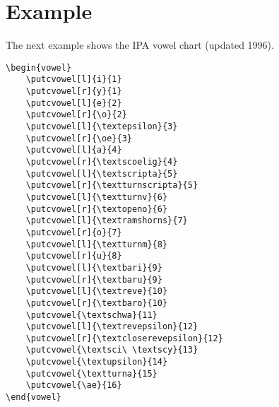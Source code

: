 \documentclass[a4paper]{article}
\newenvironment{texsrc}{\begin{minipage}[t]{7cm}}{\end{minipage}}
\begin{document}

\newpage
\section{Example}

The next example shows the IPA vowel chart (updated 1996).

\begin{center}
{\Large
\begin{vowel}
\end{vowel}
}

\bigskip
\begin{texsrc}
\begin{verbatim}
\begin{vowel}
    \putcvowel[l]{i}{1}
    \putcvowel[r]{y}{1}
    \putcvowel[l]{e}{2}
    \putcvowel[r]{\o}{2}
    \putcvowel[l]{\textepsilon}{3}
    \putcvowel[r]{\oe}{3}
    \putcvowel[l]{a}{4}
    \putcvowel[r]{\textscoelig}{4}
    \putcvowel[l]{\textscripta}{5}
    \putcvowel[r]{\textturnscripta}{5}
    \putcvowel[l]{\textturnv}{6}
    \putcvowel[r]{\textopeno}{6}
    \putcvowel[l]{\textramshorns}{7}
    \putcvowel[r]{o}{7}
    \putcvowel[l]{\textturnm}{8}
    \putcvowel[r]{u}{8}
    \putcvowel[l]{\textbari}{9}
    \putcvowel[r]{\textbaru}{9}
    \putcvowel[l]{\textreve}{10}
    \putcvowel[r]{\textbaro}{10}
    \putcvowel{\textschwa}{11}
    \putcvowel[l]{\textrevepsilon}{12}
    \putcvowel[r]{\textcloserevepsilon}{12}
    \putcvowel{\textsci\ \textscy}{13}
    \putcvowel{\textupsilon}{14}
    \putcvowel{\textturna}{15}
    \putcvowel{\ae}{16}
\end{vowel}
\end{verbatim}
\end{texsrc}
\end{center}
\end{document}
